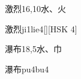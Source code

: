 \begin{entry}{激烈}{16,10}{⽔、⽕}
  \begin{phonetics}{激烈}{ji1lie4}[][HSK 4]
  \end{phonetics}
\end{entry}

\begin{entry}{瀑布}{18,5}{⽔、⼱}
  \begin{phonetics}{瀑布}{pu4bu4}
  \end{phonetics}
\end{entry}


